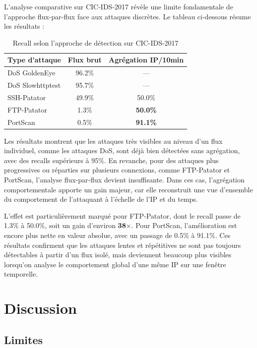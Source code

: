 \documentclass[11pt,a4paper]{article}
\begin{document}
L'analyse comparative sur CIC-IDS-2017 révèle une limite fondamentale de
l'approche flux-par-flux face aux attaques discrètes. Le tableau ci-dessous
résume les résultats :

\begin{table}[H]
\centering
\caption{Recall selon l'approche de détection sur CIC-IDS-2017}
\begin{tabular}{lcc}
\toprule
\textbf{Type d'attaque} & \textbf{Flux brut} & \textbf{Agrégation IP/10min} \\
\midrule
DoS GoldenEye   & 96.2\% & --- \\
DoS Slowhttptest & 95.7\% & --- \\
SSH-Patator     & 49.9\% & 50.0\% \\
FTP-Patator     & 1.3\%  & \textbf{50.0\%} \\
PortScan        & 0.5\%  & \textbf{91.1\%} \\
\bottomrule
\end{tabular}
\end{table}

Les résultats montrent que les attaques très visibles au niveau d'un flux
individuel, comme les attaques DoS, sont déjà bien détectées sans
agrégation, avec des recalls supérieurs à 95\%. En revanche, pour des
attaques plus progressives ou réparties sur plusieurs connexions, comme
FTP-Patator et PortScan, l'analyse flux-par-flux devient insuffisante. Dans
ces cas, l'agrégation comportementale apporte un gain majeur, car elle
reconstruit une vue d'ensemble du comportement de l'attaquant à l'échelle
de l'IP et du temps.

L'effet est particulièrement marqué pour FTP-Patator, dont le recall passe
de 1.3\% à 50.0\%, soit un gain d'environ \textbf{38$\times$}. Pour
PortScan, l'amélioration est encore plus nette en valeur absolue, avec un
passage de 0.5\% à 91.1\%. Ces résultats confirment que les attaques lentes
et répétitives ne sont pas toujours détectables à partir d'un flux isolé,
mais deviennent beaucoup plus visibles lorsqu'on analyse le comportement
global d'une même IP sur une fenêtre temporelle.


\section{Discussion}

\subsection{Limites}
\end{document}
